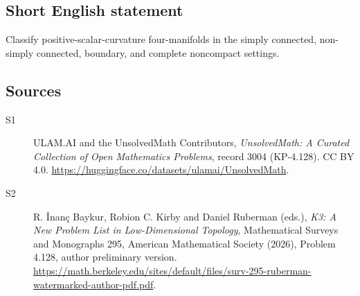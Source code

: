 \documentclass[11pt]{article}
\begin{document}
\subsection{Short English statement}
Classify positive-scalar-curvature four-manifolds in the simply connected, non-simply connected, boundary, and complete noncompact settings.
\subsection{Sources}
\begin{description}
\item[\hypertarget{source:3004:1}{S1}] ULAM.AI and the UnsolvedMath Contributors, \emph{UnsolvedMath: A Curated Collection of Open Mathematics Problems}, record 3004 (KP-4.128). CC BY 4.0. \url{https://huggingface.co/datasets/ulamai/UnsolvedMath}.
\item[\hypertarget{source:3004:2}{S2}] R. İnanç Baykur, Robion C. Kirby and Daniel Ruberman (eds.), \emph{K3: A New Problem List in Low-Dimensional Topology}, Mathematical Surveys and Monographs 295, American Mathematical Society (2026), Problem 4.128, author preliminary version. \url{https://math.berkeley.edu/sites/default/files/surv-295-ruberman-watermarked-author-pdf.pdf}.
\end{description}
\label{end:3004}
\end{document}

